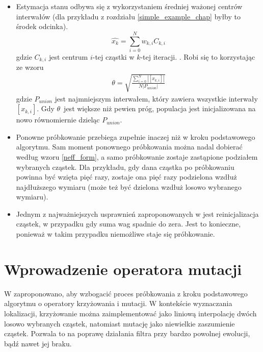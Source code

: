 \begin{itemize}
	\item Estymacja stanu odbywa się z wykorzystaniem średniej ważonej centrów interwałów (dla przykładu z rozdziału \ref{simple_example_chap} byłby to środek odcinka).
	\begin{equation} \label{bpf_est}
		\hat{x_k} = \sum_{i=0}^{N} w_{k,i} C_{k,i}
	\end{equation}
	gdzie $C_{k,i}$ jest centrum $i$-tej cząstki w $k$-tej iteracji.
. Robi się to korzystając ze wzoru
	\begin{equation}\label{theta_coeff}
		\begin{aligned}
			\theta = \sqrt{\frac{\sum_{i=0}^{N}|[x_{k,i}]|}{N |P_{union}|}}
		\end{aligned}
	\end{equation}
	gdzie $P_{union}$ jest najmniejszym interwałem, który zawiera wszystkie interwały $[x_{k,i}]$. Gdy $\theta$~jest większe niż pewien próg, populacja jest inicjalizowana na nowo równomiernie dzieląc $P_{union}$.
	
	\item Ponowne próbkowanie przebiega zupełnie inaczej niż w kroku  podstawowego algorytmu. Sam moment ponownego próbkowania można nadal dobierać według wzoru \ref{neff_form}, a samo próbkowanie zostaje zastąpione podziałem wybranych cząstek. Dla przykładu, gdy dana cząstka po próbkowaniu powinna być wzięta pięć razy, zostaje ona pięć razy podzielona wzdłuż najdłuższego wymiaru (może też być dzielona wzdłuż losowo wybranego wymiaru).
	\item Jednym z najważniejszych usprawnień zaproponowanych w \cite{brbpf} jest reinicjalizacja cząstek, w przypadku gdy suma wag spadnie do zera. Jest to konieczne, ponieważ w takim przypadku niemożliwe staje się próbkowanie.
\end{itemize}

\section{Wprowadzenie operatora mutacji} \label{evol_chap}
W \cite{pfgen} zaproponowano, aby wzbogacić proces próbkowania z kroku  podstawowego algorytmu o operatory krzyżowania i mutacji. W kontekście wyznaczania lokalizacji, krzyżowanie można zaimplementować jako liniową interpolację dwóch losowo wybranych cząstek, natomiast mutację jako niewielkie zaszumienie cząstek. Pozwala to na poprawę działania filtra przy bardzo powolnej ewolucji, bądź nawet jej braku.
